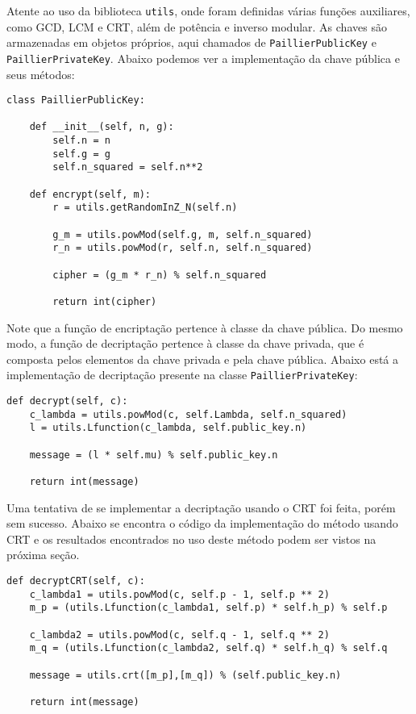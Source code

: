 \documentclass[10pt]{article}
\begin{document}
        Atente ao uso da biblioteca \texttt{utils}, onde foram definidas várias funções auxiliares, como GCD, LCM e CRT, além de potência e inverso modular. As chaves são armazenadas em objetos próprios, aqui chamados de \texttt{PaillierPublicKey} e \texttt{PaillierPrivateKey}. Abaixo podemos ver a implementação da chave pública e seus métodos:

        \begin{verbatim}
class PaillierPublicKey:

    def __init__(self, n, g):
        self.n = n
        self.g = g
        self.n_squared = self.n**2

    def encrypt(self, m):
        r = utils.getRandomInZ_N(self.n)

        g_m = utils.powMod(self.g, m, self.n_squared)
        r_n = utils.powMod(r, self.n, self.n_squared)

        cipher = (g_m * r_n) % self.n_squared

        return int(cipher)            
        \end{verbatim}

        Note que a função de encriptação pertence à classe da chave pública. Do mesmo modo, a função de decriptação pertence à classe da chave privada, que é composta pelos elementos da chave privada e pela chave pública. Abaixo está a implementação de decriptação presente na classe \texttt{PaillierPrivateKey}:

        \begin{verbatim}
def decrypt(self, c):
    c_lambda = utils.powMod(c, self.Lambda, self.n_squared)
    l = utils.Lfunction(c_lambda, self.public_key.n)

    message = (l * self.mu) % self.public_key.n

    return int(message)            
        \end{verbatim}

        Uma tentativa de se implementar a decriptação usando o CRT foi feita, porém sem sucesso. Abaixo se encontra o código da implementação do método usando CRT e os resultados encontrados no uso deste método podem ser vistos na próxima seção.

        \begin{verbatim}
def decryptCRT(self, c):
    c_lambda1 = utils.powMod(c, self.p - 1, self.p ** 2)
    m_p = (utils.Lfunction(c_lambda1, self.p) * self.h_p) % self.p

    c_lambda2 = utils.powMod(c, self.q - 1, self.q ** 2)
    m_q = (utils.Lfunction(c_lambda2, self.q) * self.h_q) % self.q

    message = utils.crt([m_p],[m_q]) % (self.public_key.n)

    return int(message)            
        \end{verbatim}
\end{document}
